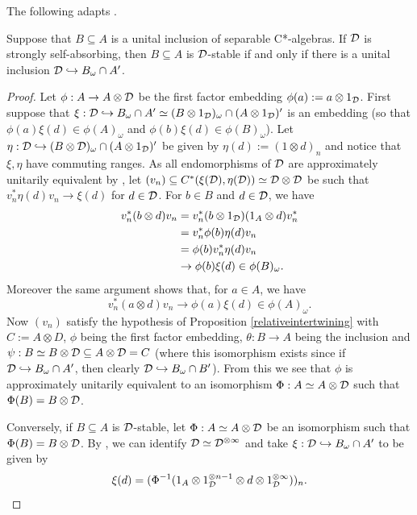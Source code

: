 \documentclass[12pt]{amsart}
\begin{document}
   The following adapts  \cite[Theorem 7.2.2]{RordamBook}.
     \begin{theorem}\label{equivDstable}
         Suppose that $B \subseteq A$ is a unital inclusion of separable C*-algebras. If $\mathcal{D}$ is strongly self-absorbing, then $B \subseteq A$ is $\mathcal{D}$-stable if and only if there is a unital inclusion $\mathcal{D} \hookrightarrow B_\omega \cap A'$. 
           \begin{proof}
             Let $\phi: A \to A \otimes \mathcal{D}$ be the first factor embedding $\phi(a) := a \otimes 1_{\mathcal{D}}$. First suppose that $\xi: \mathcal{D} \hookrightarrow B_\omega \cap A' \simeq (B \otimes 1_{\mathcal{D}})_\omega \cap (A \otimes 1_{\mathcal{D}})'$ is an embedding (so that $\phi(a)\xi(d) \in \phi(A)_\omega$ and $\phi(b)\xi(d) \in \phi(B)_\omega$). Let $\eta: \mathcal{D} \hookrightarrow (B \otimes \mathcal{D})_\omega \cap (A \otimes 1_{\mathcal{D}})'$ be given by $\eta(d) := (1 \otimes d)_n$ and notice that $\xi,\eta$ have commuting ranges. As all endomorphisms of $\mathcal{D}$ are approximately unitarily equivalent by \cite[Corollary 1.12]{TomsWinter07}, let $(v_n) \subseteq C^*(\xi(\mathcal{D}),\eta(\mathcal{D})) \simeq \mathcal{D} \otimes \mathcal{D}$ be such that $v_n^*\eta(d)v_n \to \xi(d)$ for $d \in \mathcal{D}$. For $b \in B$ and $d \in \mathcal{D}$, we have
\begin{equation}
\begin{split}
             v_n^*(b \otimes d)v_n &= v_n^*(b \otimes 1_{\mathcal{D}})(1_A \otimes d)v_n^* \\
             &= v_n^*\phi(b)\eta(d)v_n \\
             &= \phi(b)v_n^*\eta(d)v_n \\
             &\to \phi(b)\xi(d) \in \phi(B)_\omega. 
             \end{split}
\end{equation}
             Moreover the same argument shows that, for $a \in A$, we have
\begin{equation}
             v_n^*(a \otimes d)v_n \to \phi(a)\xi(d) \in \phi(A)_\omega.
\end{equation}
             Now $(v_n)$ satisfy the hypothesis of Proposition \ref{relativeintertwining} with $C := A \otimes D$, $\phi$ being the first factor embedding, $\theta: B \to A$ being the inclusion and $\psi: B \simeq B \otimes \mathcal{D} \subseteq A \otimes \mathcal{D} = C$ (where this isomorphism exists since if $\mathcal{D} \hookrightarrow B_\omega \cap A'$, then clearly $\mathcal{D} \hookrightarrow B_\omega \cap B'$). From this we see that $\phi$ is approximately unitarily equivalent to an isomorphism $\Phi:A \simeq A \otimes \mathcal{D}$ such that $\Phi(B) = B \otimes \mathcal{D}$.

             Conversely, if $B \subseteq A$ is $\mathcal{D}$-stable, let $\Phi: A \simeq A \otimes \mathcal{D}$ be an isomorphism such that $\Phi(B) = B \otimes \mathcal{D}$. By \cite[Proposition 1.10(iv)]{TomsWinter07}, we can identify $\mathcal{D} \simeq \mathcal{D}^{\otimes \infty}$ and take $\xi: \mathcal{D} \hookrightarrow B_\omega \cap A'$ to be given by
\begin{equation}
             \xi(d) = (\Phi^{-1}(1_A \otimes 1_{\mathcal{D}}^{\otimes n-1} \otimes d \otimes 1_{\mathcal{D}}^{\otimes \infty}))_n.
\end{equation}
           \end{proof}
       \end{theorem}
\end{document}
